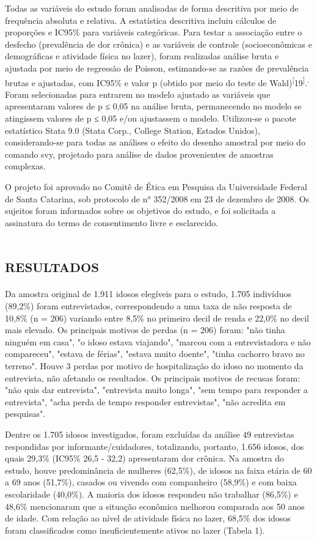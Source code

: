 \documentclass{article}
\begin{document}
Todas as variáveis do estudo foram analisadas de forma descritiva por meio de
frequência absoluta e relativa. A estatística descritiva incluiu cálculos de
proporções e IC95\% para variáveis categóricas. Para testar a associação entre o
desfecho (prevalência de dor crônica) e as variáveis de controle
(socioeconômicas e demográficas e atividade física no lazer), foram realizadas
análise bruta e ajustada por meio de regressão de Poisson, estimando-se as
razões de prevalência brutas e ajustadas, com IC95\% e valor p (obtido por meio
do teste de Wald)\textsuperscript{[}19\textsuperscript{]}.\textsuperscript{.}
Foram selecionadas para entrarem no modelo ajustado as variáveis que
apresentaram valores de p ≤ 0,05 na análise bruta, permanecendo no modelo se
atingissem valores de p ≤ 0,05 e/ou ajustassem o modelo. Utilizou-se o pacote
estatístico Stata 9.0 (Stata Corp., College Station, Estados Unidos),
considerando-se para todas as análises o efeito do desenho amostral por meio do
comando svy, projetado para análise de dados provenientes de amostras complexas.

O projeto foi aprovado no Comitê de Ética em Pesquisa da Universidade Federal de
Santa Catarina, sob protocolo de n° 352/2008 em 23 de dezembro de 2008. Os
sujeitos foram informados sobre os objetivos do estudo, e foi solicitada a
assinatura do termo de consentimento livre e esclarecido.

\section{\textsc{resultados}}

Da amostra original de 1.911 idosos elegíveis para o estudo, 1.705 indivíduos
(89,2\%) foram entrevistados, correspondendo a uma taxa de não resposta de
10,8\% (n = 206) variando entre 8,5\% no primeiro decil de renda e 22,0\% no
decil mais elevado. Os principais motivos de perdas (n = 206) foram: "não tinha
ninguém em casa", "o idoso estava viajando", "marcou com a entrevistadora e não
compareceu", "estava de férias", "estava muito doente", "tinha cachorro bravo no
terreno". Houve 3 perdas por motivo de hospitalização do idoso no momento da
entrevista, não afetando os resultados. Os principais motivos de recusas foram:
"não quis dar entrevista", "entrevista muito longa", "sem tempo para responder a
entrevista", "acha perda de tempo responder entrevistas", "não acredita em
pesquisas".

Dentre os 1.705 idosos investigados, foram excluídas da análise 49 entrevistas
respondidas por informante/cuidadores, totalizando, portanto, 1.656 idosos, dos
quais 29,3\% (IC95\% 26,5 - 32,2) apresentaram dor crônica. Na amostra do
estudo, houve predominância de mulheres (62,5\%), de idosos na faixa etária de
60 a 69 anos (51,7\%), casados ou vivendo com companheiro (58,9\%) e com baixa
escolaridade (40,0\%). A maioria dos idosos respondeu não trabalhar (86,5\%) e
48,6\% mencionaram que a situação econômica melhorou comparada aos 50 anos de
idade. Com relação ao nível de atividade física no lazer, 68,5\% dos idosos
foram classificados como insuficientemente ativos no lazer (Tabela 1).
\end{document}
